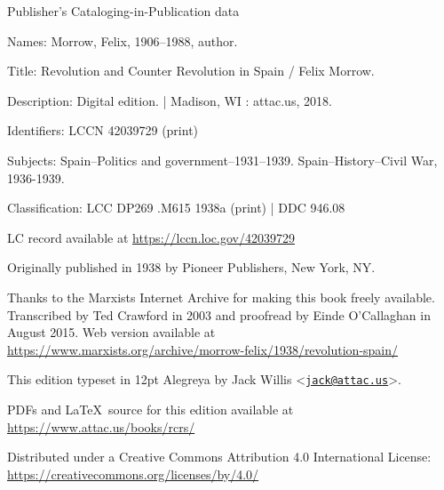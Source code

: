 {
	\setlength{\parindent}{0em}
	\setlength{\parskip}{0.5em}
	\sloppy
	
	\vspace*{\fill}
	
	Publisher’s Cataloging-in-Publication data
	
	\vspace{0.5em}
	
	{\setlength{\parskip}{0em}
		Names: Morrow, Felix, 1906--1988, author.
		
		Title: Revolution and Counter Revolution in Spain / Felix Morrow.
		
		Description: Digital edition. | Madison, WI : 
		attac.us, 2018.
		
		Identifiers: LCCN 42039729 (print)
		
		\hangindent=0.7cm
		Subjects: Spain--Politics and government--1931--1939. Spain--History--Civil War, 1936-1939.
		
		Classification: LCC DP269 .M615 1938a (print) | DDC 946.08
		
		LC record available at \url{https://lccn.loc.gov/42039729}
	}
	
	\vspace*{\fill}
	
	Originally published in 1938 by Pioneer Publishers, New York, NY.
	
	Thanks to the Marxists Internet Archive
	for making this book freely available.
	Transcribed by Ted Crawford in 2003
	and proofread by Einde O’Callaghan in August 2015.
	Web version available at
	\url{https://www.marxists.org/archive/morrow-felix/1938/revolution-spain/}
	
	This edition typeset in 12pt Alegreya by Jack Willis
	<\href{mailto:jack@attac.us}{\texttt{jack@attac.us}}>.
	
	PDFs and \LaTeX\ source for this edition available at \url{https://www.attac.us/books/rcrs/}
	
	Distributed under a Creative Commons Attribution 4.0 International License:
	\url{https://creativecommons.org/licenses/by/4.0/}
}


\newpage
\thispagestyle{empty}
\ \\

\newpage
\thispagestyle{empty}
\ \\